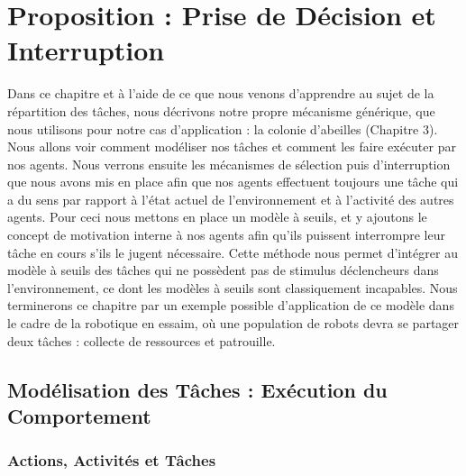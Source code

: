 \chapter{Proposition : Prise de Décision et Interruption}
	Dans ce chapitre et à l'aide de ce que nous venons d'apprendre au sujet de la répartition des tâches, nous décrivons notre propre mécanisme générique, que nous utilisons pour notre cas d'application : la colonie d'abeilles (Chapitre 3). Nous allons voir comment modéliser nos tâches et comment les faire exécuter par nos agents. Nous verrons ensuite les mécanismes de sélection puis d'interruption que nous avons mis en place afin que nos agents effectuent toujours une tâche qui a du sens par rapport à l'état actuel de l'environnement et à l'activité des autres agents. Pour ceci nous mettons en place un modèle à seuils, et y ajoutons le concept de motivation interne à nos agents afin qu'ils puissent interrompre leur tâche en cours s'ils le jugent nécessaire. Cette méthode nous permet d'intégrer au modèle à seuils des tâches qui ne possèdent pas de stimulus déclencheurs dans l'environnement, ce dont les modèles à seuils sont classiquement incapables. Nous terminerons ce chapitre par un exemple possible d'application de ce modèle dans le cadre de la robotique en essaim, où une population de robots devra se partager deux tâches : collecte de ressources et patrouille.
	
	\section{Modélisation des Tâches : Exécution du Comportement}	
	
		\subsection{Actions, Activités et Tâches}
